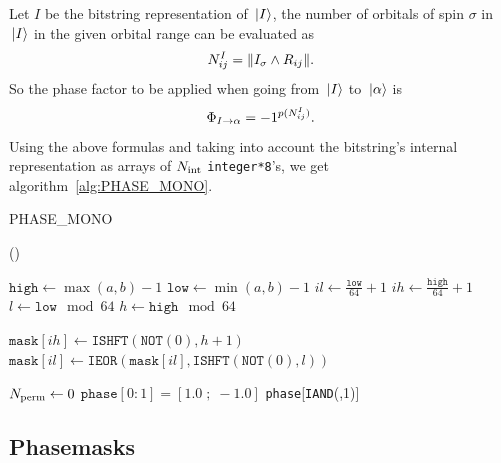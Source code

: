 \documentclass[./thesis.tex]{subfiles}
\begin{document}
Let $I$ be the bitstring representation of ${\ket*{I}}$, the number of orbitals of spin $\sigma$ in ${\ket*{I}}$ in the given orbital range can be evaluated as
\begin{equation}
N^{I}_{ij} = \norm{I_{\sigma} \wedge R_{ij}}.
\end{equation}
So the phase factor to be applied when going from ${\ket*{I}}$ to ${\ket*{\alpha}}$ is 
\begin{equation}
\Phi_{I \rightarrow \alpha} = -1^{p(N^I_{ij})}.
\end{equation}
Using the above formulas and taking into account the bitstring's internal representation as arrays of ${N_\text{int}}$ \lstinline{integer*8}'s, we get algorithm~\ref{alg:PHASE_MONO}.   


\begin{algorithm}
	\caption{PHASE\_MONO}	
	\label{alg:PHASE_MONO}
	
	\Fn(){}{
		$\texttt{high} \gets \max(a,b)-1$ \;
		$\texttt{low} \gets \min(a,b)-1$ \;
		$il \gets \frac{\texttt{low}}{64} + 1$ \;
		$ih \gets \frac{\texttt{high}}{64} + 1$ \;
		$l \gets \texttt{low} \mod 64$ \;
		$h \gets \texttt{high} \mod 64$ \; 

		
		$\texttt{mask}[ih] \gets \texttt{ISHFT}(\texttt{NOT}(0), h+1)$ \;
		$\texttt{mask}[il] \gets \texttt{IEOR}(\texttt{mask}[il], \texttt{ISHFT}(\texttt{NOT}(0), l))$ \;
		
		
		${N_\text{perm}} \gets 0$ \;
                $\texttt{phase}[0:1] = [ 1.0 \;;\; -1.0 ]$ \;
                \KwRet \texttt{phase}[\texttt{IAND}(\Nperm,1)] \;
		}
\end{algorithm}
        

\subsection{Phasemasks}
\end{document}
